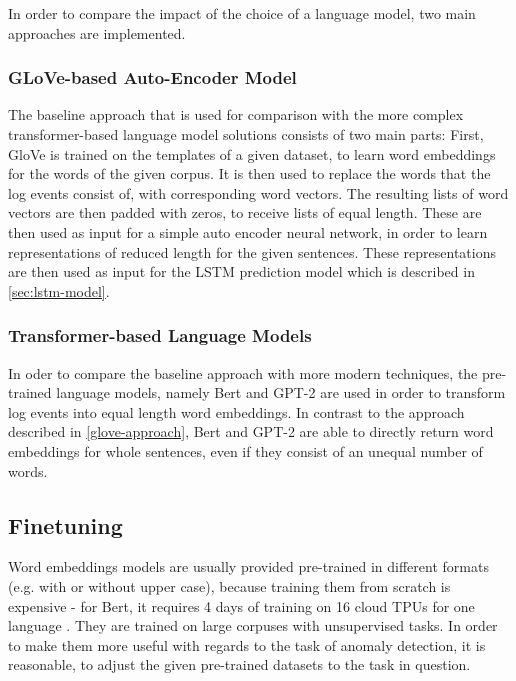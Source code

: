 In order to compare the impact of the choice of a language model, two main approaches are implemented.

\subsubsection{GLoVe-based Auto-Encoder Model \label{glove-approach}}
The baseline approach that is used for comparison with the more complex transformer-based language model solutions consists of two main parts: First, GloVe \cite{pennington2014glove} is trained on the templates of a given dataset, to learn word embeddings for the words of the given corpus. It is then used to replace the words that the log events consist of, with corresponding word vectors. The resulting lists of word vectors are then padded with zeros, to receive lists of equal length. These are then used as input for a simple auto encoder neural network, in order to learn representations of reduced length for the given sentences. These representations are then used as input for the LSTM prediction model which is described in \ref{sec:lstm-model}.

\subsubsection{Transformer-based Language Models \label{transformer-approach}}
In oder to compare the baseline approach with more modern techniques, the pre-trained language models, namely Bert and GPT-2 are used in order to transform log events into equal length word embeddings. In contrast to the approach described in \ref{glove-approach}, Bert and GPT-2 are able to directly return word embeddings for whole sentences, even if they consist of an unequal number of words.



\subsection{Finetuning\label{sec:finetuning}}
Word embeddings models are usually provided pre-trained in different formats (e.g. with or without upper case), because training them from scratch is expensive - for Bert, it requires 4 days of training on 16 cloud TPUs for one language \cite{googlebert}. They are trained on large corpuses with unsupervised tasks. In order to make them more useful with regards to the task of anomaly detection, it is reasonable, to adjust the given pre-trained datasets to the task in question. 

